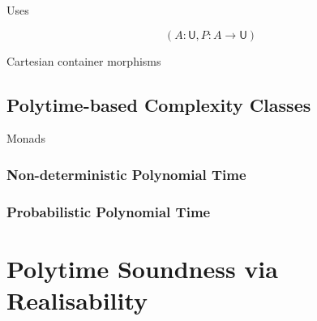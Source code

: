 \documentclass[acmsmall,review,screen,anonymous]{acmart}
\begin{document}
Uses

\begin{displaymath}
  (A : \mathsf{U}, P : A \to \mathsf{U})
\end{displaymath}

Cartesian container morphisms

\subsection{Polytime-based Complexity Classes}

Monads

\subsubsection{Non-deterministic Polynomial Time}



\subsubsection{Probabilistic Polynomial Time}



\section{Polytime Soundness via Realisability}
\label{sec:soundness}

\newcommand{\cstaccess}{1}
\newcommand{\cstmkclo}{1}
\newcommand{\cstapp}{1}
\newcommand{\cstmkpair}{1}
\newcommand{\cstmkunit}{1}
\newcommand{\cstTrue}{1}
\newcommand{\cstFalse}{1}
\newcommand{\cstLetpair}{1}
\newcommand{\cstSeq}{1}
\newcommand{\cstIf}{1}



\newcommand{\clo}[2]{\mathsf{clo}\langle #1 , #2 \rangle}
\newcommand{\synTrue}{\mathsf{true}}
\newcommand{\synFalse}{\mathsf{false}}
\end{document}
